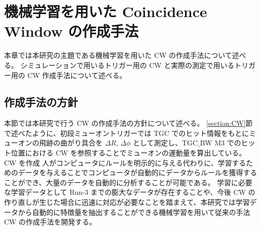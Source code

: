 \chapter{機械学習を用いた Coincidence Window の作成手法}
本章では本研究の主題である機械学習を用いた CW の作成手法について述べる。
シミュレーションで用いるトリガー用の CW と実際の測定で用いるトリガー用の CW 作成手法について述べる。

\section{作成手法の方針}
本節では本研究で行う CW の作成手法の方針について述べる。
\ref{section:CW}節で述べたように、初段ミューオントリガーでは TGC でのヒット情報をもとにミューオンの飛跡の曲がり具合を $\Delta R$, $\Delta \phi$ として測定し、TGC$\_$BW M3 でのヒット位置における CW を参照することでミューオンの運動量を算出している。
CW を作成
人がコンピュータにルールを明示的に与える代わりに、学習するためのデータを与えることでコンピュータが自動的にデータからルールを獲得することができ、大量のデータを自動的に分析することが可能である。
学習に必要な学習データとして Run-3 までの膨大なデータが存在することや、今後 CW の作り直しが生じた場合に迅速に対応が必要なことを踏まえて、本研究では学習データから自動的に特徴量を抽出することができる機械学習を用いて従来の手法 CW の作成手法を開発する。



